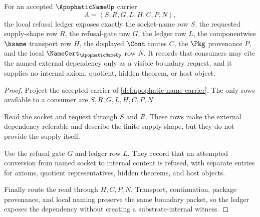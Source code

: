 \begin{theorem}
\label{thm:apophatic-name-refusal-ledger}
For an accepted $\ApophaticNameUp$ carrier
$$
A=(S,R,G,L,H,C,P,N),
$$
the local refusal ledger exposes exactly the socket-name row $S$, the requested supply-shape row $R$, the refusal-gate row $G$, the ledger row $L$, the componentwise $\hsame$ transport row $H$, the displayed $\Cont$ routes $C$, the $\Pkg$ provenance $P$, and the local $\NameCert_{\ApophaticNameUp}$ row $N$. It records that consumers may cite the named external dependency only as a visible boundary request, and it supplies no internal axiom, quotient, hidden theorem, or host object.
\end{theorem}
\begin{proof}
Project the accepted carrier of \autoref{def:apophatic-name-carrier}. The only rows available to a consumer are $S,R,G,L,H,C,P,N$.

Read the socket and request through $S$ and $R$. These rows make the external dependency referable and describe the finite supply shape, but they do not provide the supply itself.

Use the refusal gate $G$ and ledger row $L$. They record that an attempted conversion from named socket to internal content is refused, with separate entries for axioms, quotient representatives, hidden theorems, and host objects.

Finally route the read through $H,C,P,N$. Transport, continuation, package provenance, and local naming preserve the same boundary packet, so the ledger exposes the dependency without creating a substrate-internal witness.
\end{proof}

